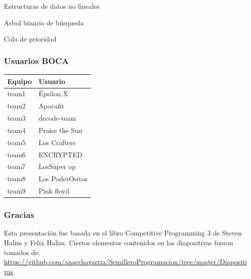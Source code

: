 \documentclass{beamer}
\begin{document}
\begin{section}{Estructuras de datos no lineales}
\begin{subsection}{Arbol binario de búsqueda}
\begin{subsubsection}{Cola de prioridad}
	\begin{frame}[fragile]
		\frametitle{Usuarios BOCA}
		\begin{center}
  			\begin{tabular}{| l | l |}
    			\hline
			\textbf{Equipo} & \textbf{Usuario} \\ \hline
   			team1 & Épsilon X \\ \hline
   			team2 & Apocafit \\ \hline
			team3 & decode-team \\ \hline
			team4 & Praise the Sun \\ \hline
			team5 & Los Crafters \\ \hline
			team6 & ENCRYPTED \\ \hline
			team7 & LosSuper op \\ \hline
			team8 & Los PoderOsitos \\ \hline
    			team9 & Pink floyd \\
    			\hline
  			\end{tabular}
		\end{center}
	\end{frame}

	\begin{frame}
		\frametitle{Gracias}
		Esta presentación fue basada en el libro Competitive Programming 3 de Steven Halim y Felix Halim.
		\newline
		Ciertos elementos contenidos en las diapositivas fueron tomados de:\\
		\url{https://github.com/anaechavarria/SemilleroProgramacion/tree/master/Diapositivas}
	\end{frame}
\end{subsubsection}
\end{subsection}
\end{section}
\end{document}
